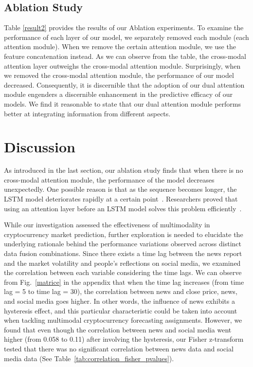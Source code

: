 \subsection{Ablation Study}
Table \ref{result2} provides the results of our Ablation experiments. To examine the performance of each layer of our model, we separately removed each module (each attention module). When we remove the certain attention module, we use the feature concatenation instead. As we can observe from the table, the cross-modal attention layer outweighs the cross-modal attention module. Surprisingly, when we removed the cross-modal attention module, the performance of our model decreased. Consequently, it is discernible that the adoption of our dual attention module engenders a discernible enhancement in the predictive efficacy of our models. We find it reasonable to state that our dual attention module performs better at integrating information from different aspects. 

\section{Discussion}
\label{discussion}
As introduced in the last section, our ablation study finds that when there is no cross-modal attention module, the performance of the model decreases unexpectedly. One possible reason is that as the sequence becomes longer, the LSTM model deteriorates rapidly at a certain point~\cite{cho2014properties}. Researchers proved that using an attention layer before an LSTM model solves this problem efficiently~\cite{qin2017dual}.


While our investigation assessed the effectiveness of multimodality in cryptocurrency market prediction, further exploration is needed to elucidate the underlying rationale behind the performance variations observed across distinct data fusion combinations. Since there exists a time lag between the news report and the market volatility and people's reflections on social media, we examined the correlation between each variable considering the time lags. We can observe from Fig.~\ref{matrice} in the appendix that when the time lag increases (from time lag = 5 to time lag = 30), the correlation between news and close price, news, and social media goes higher. In other words, the influence of news exhibits a hysteresis effect, and this particular characteristic could be taken into account when tackling multimodal cryptocurrency forecasting assignments. However, we found that even though the correlation between news and social media went higher (from 0.058 to 0.11) after involving the hysteresis, our Fisher z-transform tested that there was no significant correlation between news data and social media data (See Table~\ref{tab:correlation_fisher_pvalues}). 


